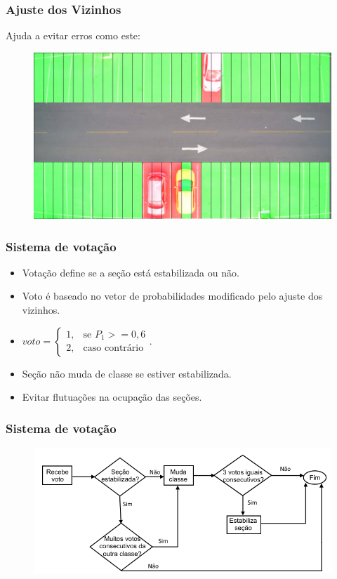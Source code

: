 \documentclass{beamer}
\begin{document}
\begin{frame}
\frametitle{Ajuste dos Vizinhos}
  Ajuda a evitar erros como este:
  \begin{figure}
	\centering
	\includegraphics[width=.4\textwidth]{erroMeio}
	\centering
\end{figure}
\end{frame}

\begin{frame}
\frametitle{Sistema de votação}
\begin{itemize}
\item Votação define se a seção está estabilizada ou não.
\item Voto é baseado no vetor de probabilidades modificado pelo ajuste dos vizinhos.
\item $voto= 
\begin{cases}
    1,& \text{se } P_1 >= 0,6\\
    2,& \text{caso contrário}
\end{cases}$.
\item Seção não muda de classe se estiver estabilizada.
\item Evitar flutuações na ocupação das seções.
\end{itemize}
\end{frame}

\begin{frame}
\frametitle{Sistema de votação}
  \begin{figure}
	\centering
	\includegraphics[width=.8\textwidth]{fluxogramaVotos}
	\centering
\end{figure}

\end{frame}
\end{document}
